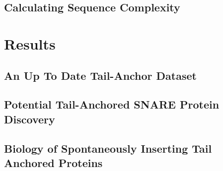 \subsection{Calculating Sequence Complexity}


\section{Results}

\subsection{An Up To Date Tail-Anchor Dataset}

\subsection{Potential Tail-Anchored SNARE Protein Discovery}

\subsection{Biology of Spontaneously Inserting Tail Anchored Proteins}
